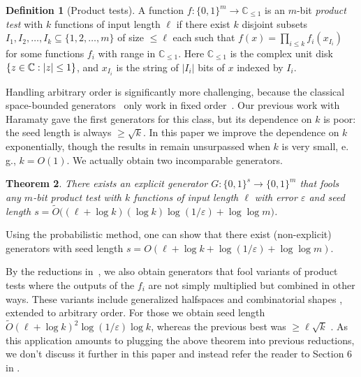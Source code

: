 \documentclass[11pt]{article}
\numberwithin{equation}{section}
\newtheorem{theorem}{Theorem}[section]
\theoremstyle{definition}
\newtheorem{definition}[theorem]{Definition}
\theoremstyle{plain}
\newcommand{\C}{\mathbb C}
\newcommand{\eg}{e.\,g.}
\newcommand{\zo}{\{0,1\}}
\def\eps{\varepsilon}
\def\Blocklength{\ell}
\DeclarePairedDelimiter{\abs}{\lvert}{\rvert}
\begin{document}
%
%
\begin{definition}[Product tests] \label{def-prod}
A function $f\colon \zo^m \to \C_{\le 1}$ is %
an $m$-bit   %
\emph{product test} with $k$
functions of input length $\Blocklength$ if there exist $k$ disjoint subsets
$I_1, I_2,\ldots, I_k \subseteq \{1, 2, \ldots, m\}$
of size $\le \Blocklength$
each  %
such that $f(x) = \prod_{i \le k} f_i(x_{I_i})$
for some functions $f_i$ with range in $\C_{\le
1}$.  Here $\C_{\le 1}$ is the complex unit disk $\{ z \in \C: \abs{z} \le 1\}$,
and $x_{I_i}$ %
is the string of   %
$|I_i|$ bits of $x$ indexed by $I_i$.
\end{definition}

Handling arbitrary order is significantly more challenging, because
the classical space-bounded generators~\cite{Nisan92,ImpagliazzoNW94}
%
%
%
only work in fixed order~\cite{Tzur09,BogdanovPW11}.  Our previous 
work with Haramaty \cite{HaramatyLV-bipnfp}
gave the first generators for this class, but 
%
its dependence   %
on $k$ is poor: the seed
length is always $\ge \sqrt{k}$.  In this %
paper  %
we improve the %
dependence  %
on $k$ exponentially, though the results in \cite{HaramatyLV-bipnfp}
%
remain   %
unsurpassed when $k$ is very small, \eg, $k = O(1)$. We actually obtain
two incomparable generators.

\begin{theorem} \label{t-prg-prod-C1}
  There exists an explicit generator $G\colon \zo^s \to \zo^m$ that fools any
 $m$-bit  %
  product test with $k$ functions of input length $\Blocklength$ with
  error $\eps$ and seed length $s = \tilde O \bigl( (\ell + \log k) (\log k) \log(1/\eps) + \log\log m \bigr)$.
\end{theorem}
%
Using the probabilistic method, one can show that there exist (non-explicit) generators with seed length $s = O(\ell + \log k + \log(1/\eps) + \log\log m)$.  %
%

By the reductions in~\cite{GopalanKM18}, we also obtain generators that
fool variants of product tests where the outputs of the $f_i$ are not simply
multiplied but combined in other ways.  These variants include generalized
halfspaces \cite{GopalanOWZ10} and combinatorial shapes
\cite{GopalanMRZ13,De15}, extended to arbitrary order.  For those we
obtain seed length $\tilde O(\Blocklength + \log k)^2 \log(1/\eps) \log k$, whereas the previous best was
$\ge \Blocklength \sqrt k$ \cite{HaramatyLV-bipnfp}. As this application amounts to plugging
the above theorem %
into  %
previous reductions, we don't discuss it further in this
paper and instead refer the reader to Section 6 in \cite{HaramatyLV-bipnfp}.
\end{document}
